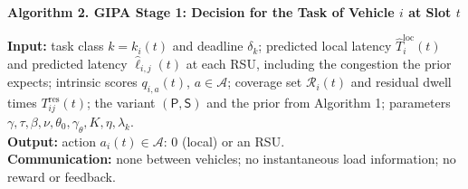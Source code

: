 \documentclass[10pt]{article}
\begin{document}
\begin{center}
{\large\bfseries Algorithm 2. GIPA Stage 1: Decision for the Task of Vehicle $i$ at Slot $t$}
\end{center}
\vspace{-3pt}

{\small
\textbf{Input:}
task class $k=k_i(t)$ and deadline $\delta_k$;
predicted local latency $\hat T^{\mathrm{loc}}_i(t)$ and predicted latency $\hat\ell_{i,j}(t)$ at each RSU, including the congestion the prior expects;
intrinsic scores $q_{i,a}(t)$, $a\in\mathcal A$;
coverage set $\mathcal R_i(t)$ and residual dwell times $T^{\mathrm{res}}_{ij}(t)$;
the variant $(\mathsf P,\mathsf S)$ and the prior from Algorithm 1;
parameters $\gamma,\tau,\beta,\nu,\theta_0,\gamma_\theta,K,\eta,\lambda_k$.\\
\textbf{Output:} action $a_i(t)\in\mathcal A$: $0$ (local) or an RSU.\\
\textbf{Communication:} none between vehicles; no instantaneous load information; no reward or feedback.
}
\end{document}
